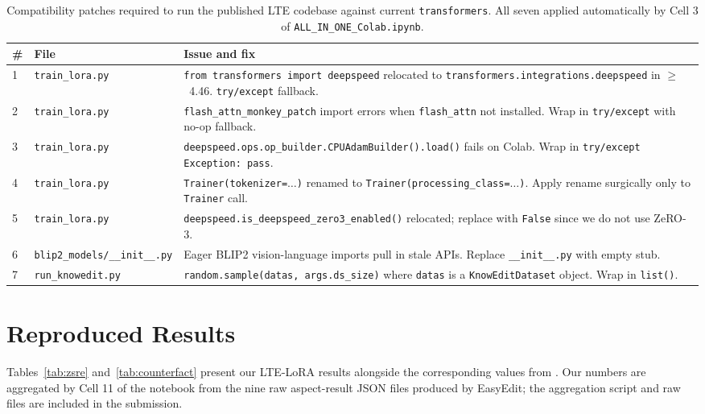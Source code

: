 \documentclass[11pt,a4paper,twocolumn]{article}
\begin{document}
\begin{table}[t]
\centering
\small
\caption{Compatibility patches required to run the published LTE codebase against current \texttt{transformers}. All seven applied automatically by Cell 3 of \texttt{ALL\_IN\_ONE\_Colab.ipynb}.}
\label{tab:patches}
\begin{tabular}{p{}p{}p{}}
\toprule
\textbf{\#} & \textbf{File} & \textbf{Issue and fix} \\
\midrule
1 & \texttt{train\_lora.py} & \texttt{from transformers import deepspeed} relocated to \texttt{transformers.integrations.deepspeed} in $\geq$~4.46. \texttt{try/except} fallback. \\
2 & \texttt{train\_lora.py} & \texttt{flash\_attn\_monkey\_patch} import errors when \texttt{flash\_attn} not installed. Wrap in \texttt{try/except} with no-op fallback. \\
3 & \texttt{train\_lora.py} & \texttt{deepspeed.ops.op\_builder.CPUAdamBuilder().load()} fails on Colab. Wrap in \texttt{try/except Exception: pass}. \\
4 & \texttt{train\_lora.py} & \texttt{Trainer(tokenizer=}$\ldots$\texttt{)} renamed to \texttt{Trainer(processing\_class=}$\ldots$\texttt{)}. Apply rename surgically only to \texttt{Trainer} call. \\
5 & \texttt{train\_lora.py} & \texttt{deepspeed.is\_deepspeed\_zero3\_enabled()} relocated; replace with \texttt{False} since we do not use ZeRO-3. \\
6 & \texttt{blip2\_models/\_\_init\_\_.py} & Eager BLIP2 vision-language imports pull in stale APIs. Replace \texttt{\_\_init\_\_.py} with empty stub. \\
7 & \texttt{run\_knowedit.py} & \texttt{random.sample(datas, args.ds\_size)} where \texttt{datas} is a \texttt{KnowEditDataset} object. Wrap in \texttt{list()}. \\
\bottomrule
\end{tabular}
\end{table}

\section{Reproduced Results}
\label{sec:results}

Tables~\ref{tab:zsre} and~\ref{tab:counterfact} present our LTE-LoRA results alongside the corresponding values from \citet{jiang2024learning}. Our numbers are aggregated by Cell 11 of the notebook from the nine raw aspect-result JSON files produced by EasyEdit; the aggregation script and raw files are included in the submission.
\end{document}
